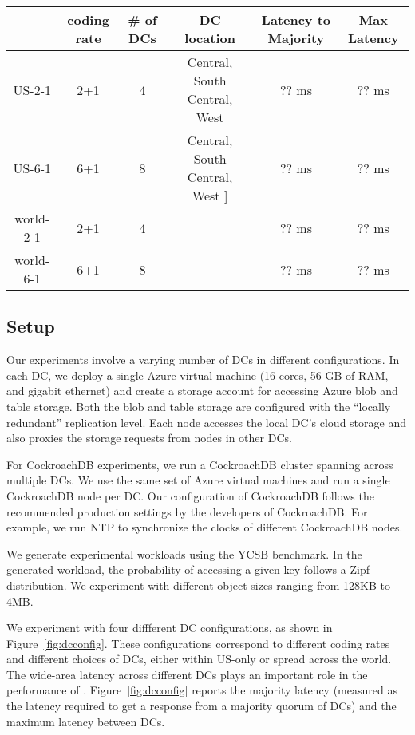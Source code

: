 \begin{figure*}
\begin{tabular}{c|c|c|c|c|c}
& coding rate & \# of DCs & DC location & Latency to Majority & Max Latency\\
\hline
US-2-1 & 2+1 & 4 & Central, South Central, West & ?? ms& ?? ms\\
US-6-1 & 6+1 & 8 & Central, South Central, West ] &?? ms&?? ms\\ 
world-2-1 & 2+1 & 4 &  &?? ms &?? ms\\
world-6-1 & 6+1 & 8 & &?? ms &?? ms\\
\end{tabular}
\caption{The DC configurations and inter-DC latencies in various experiments~\label{fig:dcconfig}} 
\end{figure*}

\subsection{Setup}
Our experiments involve a varying number of DCs in different configurations. In
each DC, we deploy a single Azure virtual machine (16 cores, 56 GB of RAM, and
gigabit ethernet) and create a storage account for accessing Azure blob and
table storage. Both the blob and table storage are configured with the
``locally redundant'' replication level.  Each \name node accesses the local
DC's cloud storage and also proxies the storage requests from \name nodes in
other DCs.  

For CockroachDB experiments, we run a CockroachDB cluster spanning across
multiple DCs.  We use the same set of Azure virtual machines and run a single
CockroachDB node per DC. Our configuration of CockroachDB follows the
recommended production settings by the developers of CockroachDB. For example,
we run NTP to synchronize the clocks of different CockroachDB nodes. 

We generate experimental workloads using the YCSB benchmark. In the generated
workload, the probability of accessing a given key follows a Zipf distribution.
We experiment with different object sizes ranging from 128KB to 4MB. 

We experiment with four diffferent DC configurations, as shown in
Figure~\ref{fig:dcconfig}.  These configurations correspond to different coding
rates and different choices of DCs, either within US-only or spread across the
world. The wide-area latency across different DCs plays an important role in 
the performance of \name.  Figure~\ref{fig:dcconfig} reports the majority
latency (measured as the latency required to get a response from a majority
quorum of DCs) and the maximum latency between DCs.


